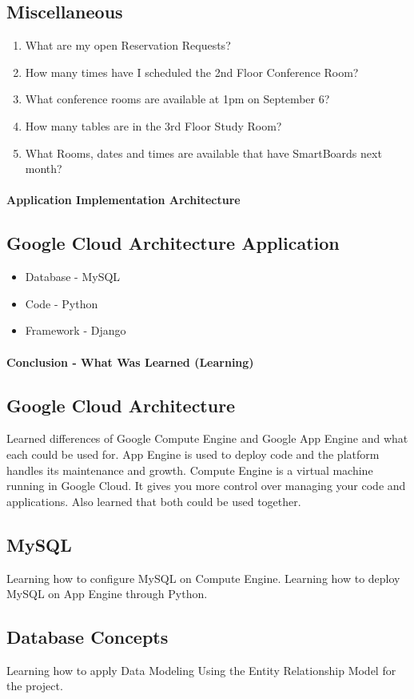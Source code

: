 \documentclass[11pt]{report}
\begin{document}
\subsection*{Miscellaneous}
\begin{enumerate}
\item What are my open Reservation Requests?
\item How many times have I scheduled the 2nd Floor Conference Room?
\item What conference rooms are available at 1pm on September 6?
\item How many tables are in the 3rd Floor Study Room?
\item What Rooms, dates and times are available that have SmartBoards next month?
\end{enumerate}

\paragraph{Application Implementation Architecture}
\subsection*{Google Cloud Architecture Application}
\begin{itemize}
    \item Database - MySQL
    \item Code - Python
    \item Framework - Django
\end{itemize}

\paragraph{Conclusion - What Was Learned (Learning)}
\subsection*{Google Cloud Architecture}
    Learned differences of Google Compute Engine and Google App Engine and what each could be used for.  App Engine is used to deploy code and the platform handles its maintenance and growth.  Compute Engine is a virtual machine running in Google Cloud. It gives you more control over managing your code and applications.  Also learned that both could be used together. 
    
 \subsection*{MySQL}   
    Learning how to configure MySQL on Compute Engine. Learning how to deploy MySQL on App Engine through Python.
    
\subsection*{Database Concepts}
Learning how to apply Data Modeling Using the Entity Relationship Model for the project.
\end{document}
